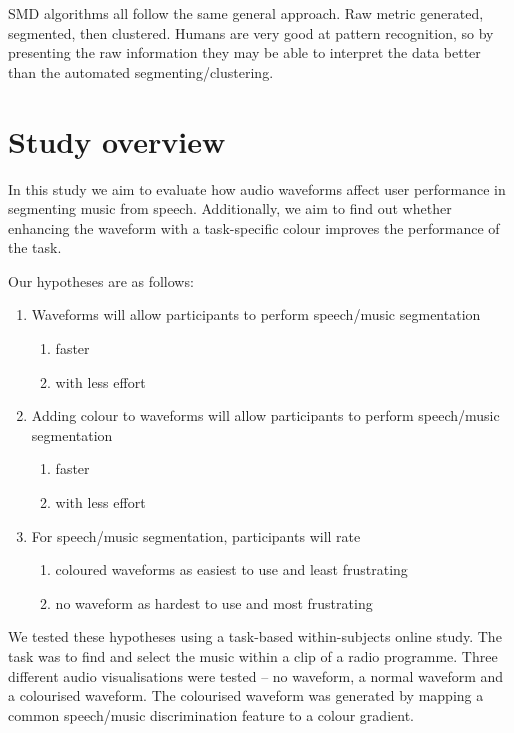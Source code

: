 SMD algorithms all follow the same general approach.
Raw metric generated, segmented, then clustered.
Humans are very good at pattern recognition, so by presenting the raw information they may be able to interpret the
data better than the automated segmenting/clustering.

\section{Study overview}

In this study we aim to evaluate how audio waveforms affect user performance in segmenting music from speech.
Additionally, we aim to find out whether enhancing the waveform with a task-specific colour improves the performance of
the task.

Our hypotheses are as follows:

{\singlespacing
\begin{enumerate}
  \item Waveforms will allow participants to perform speech/music segmentation
  \begin{enumerate}
    \item faster
    \item with less effort
  \end{enumerate}
  \item Adding colour to waveforms will allow participants to perform speech/music segmentation
  \begin{enumerate}
    \item faster
    \item with less effort
  \end{enumerate}
  \item For speech/music segmentation, participants will rate
  \begin{enumerate}
   \item coloured waveforms as easiest to use and least frustrating
   \item no waveform as hardest to use and most frustrating
  \end{enumerate}
\end{enumerate}
}

We tested these hypotheses using a task-based within-subjects online study. The task was to find and select the music
within a clip of a radio programme. Three different audio visualisations were tested -- no waveform, a normal waveform
and a colourised waveform. The colourised waveform was generated by mapping a common speech/music discrimination
feature to a colour gradient.

